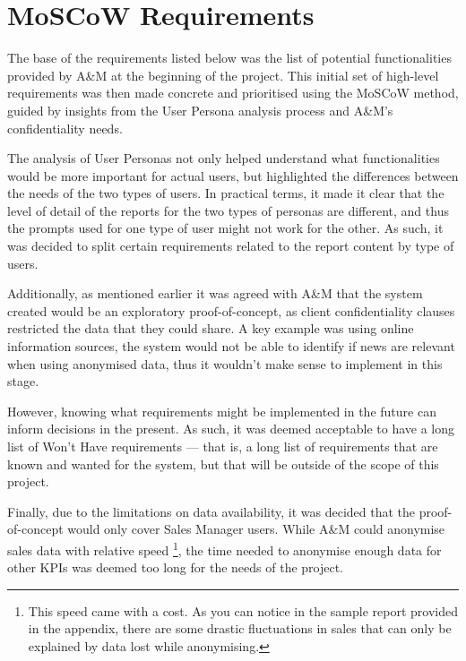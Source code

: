 \documentclass[a4paper]{report}
\begin{document}
\section{MoSCoW Requirements}


\newcommand{\frid}{FR-\arabic{frcounter}}
\newcommand{\nfrid}{NFR-\arabic{nfrcounter}}

The base of the requirements listed below was the list of potential functionalities provided by A\&M at the beginning of the project. This initial set of high-level requirements was then made concrete and prioritised using the MoSCoW method, guided by insights from the User Persona analysis process and A\&M's confidentiality needs.

The analysis of User Personas not only helped understand what functionalities would be more important for actual users, but highlighted the differences between the needs of the two types of users. In practical terms, it made it clear that the level of detail of the reports for the two types of personas are different, and thus the prompts used for one type of user might not work for the other. As such, it was decided to split certain requirements related to the report content by type of users.

Additionally, as mentioned earlier it was agreed with A\&M that the system created would be an exploratory proof-of-concept, as client confidentiality clauses restricted the data that they could share. A key example was using online information sources, the system would not be able to identify if news are relevant when using anonymised data, thus it wouldn't make sense to implement in this stage.

However, knowing what requirements might be implemented in the future can inform decisions in the present. As such, it was deemed acceptable to have a long list of Won't Have requirements --- that is, a long list of requirements that are known and wanted for the system, but that will be outside of the scope of this project.

Finally, due to the limitations on data availability, it was decided that the proof-of-concept would only cover Sales Manager users. While A\&M could anonymise sales data with relative speed \footnote{This speed came with a cost. As you can notice in the sample report provided in the appendix, there are some drastic fluctuations in sales that can only be explained by data lost while anonymising.}, the time needed to anonymise enough data for other KPIs was deemed too long for the needs of the project.
\end{document}
